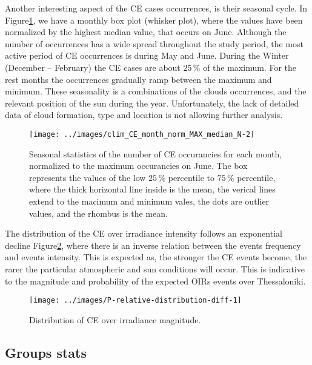 \documentclass[preprint, 3p,
authoryear]{elsarticle} %
\begin{document}
Another interesting aspect of the CE cases occurrences, is their
seasonal cycle. In
Figure\nobreakspace{}\ref{fig:relative-month-occurancies}, we have a
monthly box plot (whisker plot), where the values have been normalized
by the highest median value, that occurs on June. Although the number of
occurrences has a wide spread throughout the study period, the most
active period of CE occurrences is during May and June. During the
Winter (December -- February) the CE cases are about \(25\,\%\) of the
maximum. For the rest months the occurrences gradually ramp between the
maximum and minimum. These seasonality is a combinations of the clouds
occurrences, and the relevant position of the sun during the year.
Unfortunately, the lack of detailed data of cloud formation, type and
location is not allowing further analysis.

\begin{figure}

{\centering \texttt{[image: ../images/clim\_CE\_month\_norm\_MAX\_median\_N-2]} 

}

\caption{Seasonal statistics of the number of CE occurancies for each month, normalized to the maximum occurancies on June. The box represents the values of the low $25\,\%$ percentile to $75\,\%$ percentile, where the thick horizontal line inside is the mean, the verical lines extend to the macimum and minimum vales, the dots are outlier values, and the rhombus is the mean.}\label{fig:relative-month-occurancies}
\end{figure}

The distribution of the CE over irradiance intensity follows an
exponential decline Figure\nobreakspace{}\ref{fig:ovir-distribution},
where there is an inverse relation between the events frequency and
events intensity. This is expected as, the stronger the CE events
become, the rarer the particular atmospheric and sun conditions will
occur. This is indicative to the magnitude and probability of the
expected OIRs events over Thessaloniki.

\begin{figure}

{\centering \texttt{[image: ../images/P-relative-distribution-diff-1]} 

}

\caption{Distribution of CE over irradiance magnitude.}\label{fig:ovir-distribution}
\end{figure}

\hypertarget{groups-stats}{%
\subsection{Groups stats}\label{groups-stats}}
\end{document}
